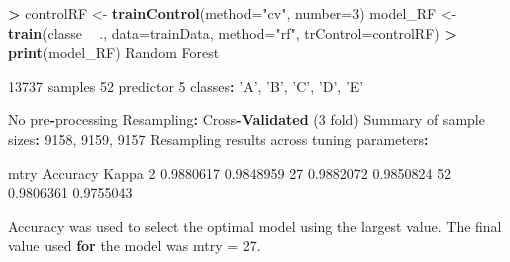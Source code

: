 \documentclass[]{article}
\newenvironment{Shaded}{\begin{snugshade}}{\end{snugshade}}
\newcommand{\ControlFlowTok}[1]{\textcolor[rgb]{0.13,0.29,0.53}{\textbf{#1}}}
\newcommand{\DataTypeTok}[1]{\textcolor[rgb]{0.13,0.29,0.53}{#1}}
\newcommand{\DecValTok}[1]{\textcolor[rgb]{0.00,0.00,0.81}{#1}}
\newcommand{\FloatTok}[1]{\textcolor[rgb]{0.00,0.00,0.81}{#1}}
\newcommand{\KeywordTok}[1]{\textcolor[rgb]{0.13,0.29,0.53}{\textbf{#1}}}
\newcommand{\NormalTok}[1]{#1}
\newcommand{\OperatorTok}[1]{\textcolor[rgb]{0.81,0.36,0.00}{\textbf{#1}}}
\newcommand{\StringTok}[1]{\textcolor[rgb]{0.31,0.60,0.02}{#1}}
\begin{document}
\begin{Shaded}
\begin{Highlighting}[]

\OperatorTok{>}\StringTok{ }\NormalTok{controlRF <-}\StringTok{ }\KeywordTok{trainControl}\NormalTok{(}\DataTypeTok{method=}\StringTok{"cv"}\NormalTok{, }\DataTypeTok{number=}\DecValTok{3}\NormalTok{)}
\NormalTok{ model_RF <-}\StringTok{ }\KeywordTok{train}\NormalTok{(classe }\OperatorTok{~}\StringTok{ }\NormalTok{., }\DataTypeTok{data=}\NormalTok{trainData, }\DataTypeTok{method=}\StringTok{"rf"}\NormalTok{, }\DataTypeTok{trControl=}\NormalTok{controlRF)}
\OperatorTok{>}\StringTok{ }\KeywordTok{print}\NormalTok{(model_RF)}
\NormalTok{Random Forest }

\DecValTok{13737}\NormalTok{ samples}
   \DecValTok{52}\NormalTok{ predictor}
    \DecValTok{5}\NormalTok{ classes}\OperatorTok{:}\StringTok{ 'A'}\NormalTok{, }\StringTok{'B'}\NormalTok{, }\StringTok{'C'}\NormalTok{, }\StringTok{'D'}\NormalTok{, }\StringTok{'E'} 

\NormalTok{No pre}\OperatorTok{-}\NormalTok{processing}
\NormalTok{Resampling}\OperatorTok{:}\StringTok{ }\NormalTok{Cross}\OperatorTok{-}\KeywordTok{Validated}\NormalTok{ (}\DecValTok{3}\NormalTok{ fold) }
\NormalTok{Summary of sample sizes}\OperatorTok{:}\StringTok{ }\DecValTok{9158}\NormalTok{, }\DecValTok{9159}\NormalTok{, }\DecValTok{9157} 
\NormalTok{Resampling results across tuning parameters}\OperatorTok{:}

\StringTok{  }\NormalTok{mtry  Accuracy   Kappa    }
   \DecValTok{2}    \FloatTok{0.9880617}  \FloatTok{0.9848959}
  \DecValTok{27}    \FloatTok{0.9882072}  \FloatTok{0.9850824}
  \DecValTok{52}    \FloatTok{0.9806361}  \FloatTok{0.9755043}

\NormalTok{Accuracy was used to select the optimal model using the largest value.}
\NormalTok{The final value used }\ControlFlowTok{for}\NormalTok{ the model was mtry =}\StringTok{ }\FloatTok{27.}
\end{Highlighting}
\end{Shaded}
\end{document}
